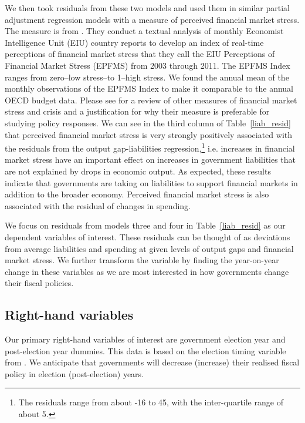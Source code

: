 \documentclass[]{article}
\begin{document}
We then took residuals from these two models and used them in similar partial adjustment regression models with a measure of perceived financial market stress. The measure is from \cite{gandrudHallEPFMS}. They conduct a textual analysis of monthly Economist Intelligence Unit (EIU) country reports to develop an index of real-time perceptions of financial market stress that they call the EIU Perceptions of Financial Market Stress (EPFMS) from 2003 through 2011. The EPFMS Index ranges from zero--low stress--to 1--high stress. We found the annual mean of the monthly observations of the EPFMS Index to make it comparable to the annual OECD budget data. Please see \cite{gandrudHallEPFMS} for a review of other measures of financial market stress and crisis and a justification for why their measure is preferable for studying policy responses. We can see in the third column of Table~\ref{liab_resid} that perceived financial market stress is very strongly positively associated with the residuals from the output gap-liabilities regression,\footnote{The residuals range from about -16 to 45, with the inter-quartile range of about 5.} i.e. increases in financial market stress have an important effect on increases in government liabilities that are not explained by drops in economic output. As expected, these results indicate that governments are taking on liabilities to support financial markets in addition to the broader economy. Perceived financial market stress is also associated with the residual of changes in spending.

We focus on residuals from models three and four in Table~\ref{liab_resid} as our dependent variables of interest. These residuals can be thought of as deviations from average liabilities and spending at given levels of output gaps and financial market stress. We further transform the variable by finding the year-on-year change in these variables as we are most interested in how governments change their fiscal policies.

\subsection*{Right-hand variables}

Our primary right-hand variables of interest are government election year and post-election year dummies. This data is based on the election timing variable from \cite{gandrudYrcurnt}. We anticipate that governments will decrease (increase) their realised fiscal policy in election (post-election) years.
\end{document}
